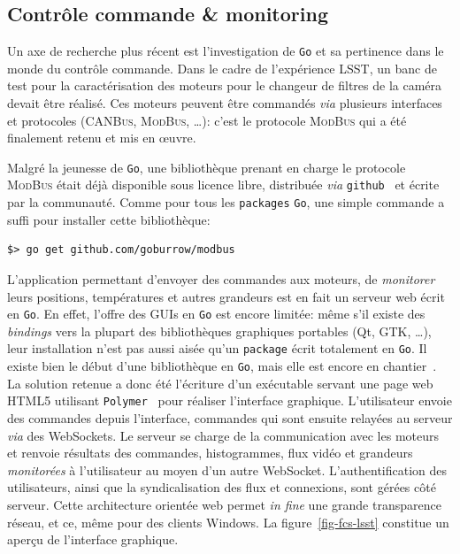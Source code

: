 \documentclass[a4paper,french]{article}
\begin{document}
\subsection*{Contr\^ole commande \& monitoring}

Un axe de recherche plus r\'ecent est l'investigation de \texttt{Go} et sa
pertinence dans le monde du contr\^ole commande.
Dans le cadre de l'exp\'erience LSST, un banc de test pour la caract\'erisation
des moteurs pour le changeur de filtres de la cam\'era devait \^etre
r\'ealis\'e.
Ces moteurs peuvent \^etre command\'es \emph{via} plusieurs interfaces et
protocoles (\textsc{CANBus}, \textsc{ModBus}, \ldots): c'est le protocole
\textsc{ModBus} qui a \'et\'e finalement retenu et mis en \oe uvre.

Malgr\'e la jeunesse de \texttt{Go}, une biblioth\`eque prenant en charge le
protocole \textsc{ModBus} \'etait d\'ej\`a disponible sous licence libre,
distribu\'ee \emph{via} \texttt{github}~\cite{ref-go-modbus} et \'ecrite par la
communaut\'e.
Comme pour tous les \texttt{packages} \texttt{Go}, une simple commande a suffi
pour installer cette biblioth\`eque:

\begin{center}
\begin{verbatim}
$> go get github.com/goburrow/modbus
\end{verbatim}
\end{center}

L'application permettant d'envoyer des commandes aux moteurs, de
\emph{monitorer} leurs positions, temp\'eratures et autres grandeurs est en fait
un serveur web \'ecrit en \texttt{Go}.
En effet, l'offre des GUIs en \texttt{Go} est encore limit\'ee: m\^eme s'il
existe des \emph{bindings} vers la plupart des biblioth\`eques graphiques
portables (Qt, GTK, \ldots), leur installation n'est pas aussi ais\'ee qu'un
\texttt{package} \'ecrit totalement en \texttt{Go}.
Il existe bien le d\'ebut d'une biblioth\`eque en \texttt{Go}, mais elle est
encore en chantier~\cite{ref-go-shiny}.
La solution retenue a donc \'et\'e l'\'ecriture d'un ex\'ecutable servant une
page web HTML5 utilisant \texttt{Polymer}~\cite{ref-polymer} pour r\'ealiser
l'interface graphique.
L'utilisateur envoie des commandes depuis l'interface, commandes qui sont
ensuite relay\'ees au serveur \emph{via} des WebSockets.
Le serveur se charge de la communication avec les moteurs et renvoie
r\'esultats des commandes, histogrammes, flux vid\'eo et grandeurs
\emph{monitor\'ees} \`a l'utilisateur au moyen d'un autre WebSocket.
L'authentification des utilisateurs, ainsi que la syndicalisation des flux et
connexions, sont g\'er\'ees c\^ot\'e serveur.
Cette architecture orient\'ee web permet \emph{in fine} une grande transparence
r\'eseau, et ce, m\^eme pour des clients Windows.
La figure~\ref{fig-fcs-lsst} constitue un aper\c cu de l'interface graphique.
\end{document}
